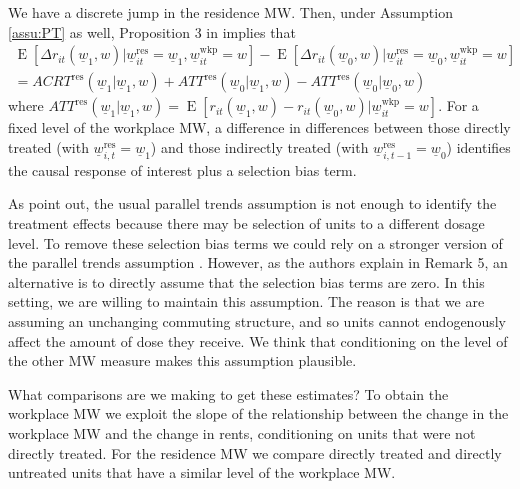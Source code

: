 \documentclass{article}
\newcommand{\mw}{\underline{w}}
\newcommand{\wkp}{\text{wkp}}
\newcommand{\res}{\text{res}}
\DeclareMathOperator{\E}{E}
\begin{document}
We have a discrete jump in the residence MW. Then, under Assumption \ref{assu:PT}
as well, Proposition 3 in \textcite{CallawayEtAl2021} implies that
\begin{equation*}
\begin{split}
\E\left[\Delta r_{it}(\mw_1, w) | \mw_{it}^{\res} = \mw_1, \mw_{it}^{\wkp} = w\right] - \E\left[\Delta r_{it}(\mw_0, w) | \mw_{it}^{\res} = \mw_0, \mw_{it}^{\wkp} = w\right] \\
 = ACRT^{\res}(\mw_1 | \mw_1, w) + ATT^{\res}(\mw_0 | \mw_1, w) - ATT^{\res}(\mw_0 | \mw_0, w)
\end{split}
\end{equation*}
where $ATT^{\res}(\mw_1 | \mw_1, w) = \E\left[r_{it}(\mw_1, w) - r_{it}(\mw_0, w) \big| \mw_{it}^{\wkp} = w\right]$.
For a fixed level of the workplace MW, a difference in differences between
those directly treated (with $\mw^{\res}_{i,t}=\mw_1$) and
those indirectly treated (with $\mw^{\res}_{i,t-1}=\mw_0$) identifies
the causal response of interest plus a selection bias term.

As \textcite{CallawayEtAl2021} point out, the usual parallel trends assumption 
is not enough to identify the treatment effects because there may be 
selection of units to a different dosage level.
To remove these selection bias terms we could rely on a stronger version of
the parallel trends assumption 
\parencite[see Assumption 5 in][]{CallawayEtAl2021}.
However, as the authors explain in Remark 5, an alternative is to directly
assume that the selection bias terms are zero.
In this setting, we are willing to maintain this assumption.
The reason is that we are assuming an unchanging commuting structure, and
so units cannot endogenously affect the amount of dose they receive.
We think that conditioning on the level of the other MW measure makes this
assumption plausible.

What comparisons are we making to get these estimates?
To obtain the workplace MW we exploit the slope of the relationship
between the change in the workplace MW and the change in rents, 
conditioning on units that were not directly treated.
For the residence MW we compare directly treated and directly untreated units
that have a similar level of the workplace MW.
\end{document}
